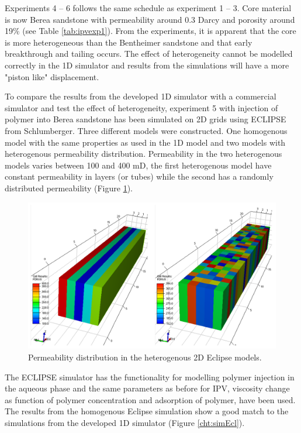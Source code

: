 \documentclass[journal = enfuem, manuscript =  article]{achemso}
\begin{document}
Experiments 4 – 6 follows the same schedule as experiment 1 – 3. Core material is now Berea sandstone with permeability around 0.3 Darcy and porosity around 19\% (see Table \ref{tab:ipvexp1}). From the experiments, it is apparent that the core is more heterogeneous than the Bentheimer sandstone and that early breakthrough and tailing occurs. The effect of heterogeneity cannot be modelled correctly in the 1D simulator and results from the simulations will have a more "piston like" displacement.

To compare the results from the developed 1D simulator with a commercial simulator and test the effect of heterogeneity, experiment 5 with injection of polymer into Berea sandstone has been simulated on 2D grids using ECLIPSE from Schlumberger. Three different models were constructed. One homogenous model with the same properties as used in the 1D model and two models with heterogenous permeability distribution. Permeability in the two heterogenous models varies between 100 and 400 mD, the first heterogenous model have constant permeability in layers (or tubes) while the second has a randomly distributed permeability (Figure \ref{cht:sim2dPerm}). 

\begin{figure}[h]
    \centering
    \includegraphics[width=\textwidth]{fig/sim2dPerm.png}
    \caption{Permeability distribution in the heterogenous 2D Eclipse models.}
    \label{cht:sim2dPerm}
\end{figure}

\enlargethispage{2cm} %
The ECLIPSE simulator has the functionality for modelling polymer injection in the aqueous phase and the same parameters as before for IPV, viscosity change as function of polymer concentration and adsorption of polymer, have been used. The results from the homogenous Eclipse simulation show a good match to the simulations from the developed 1D simulator (Figure \ref{cht:simEcl}).
\end{document}
